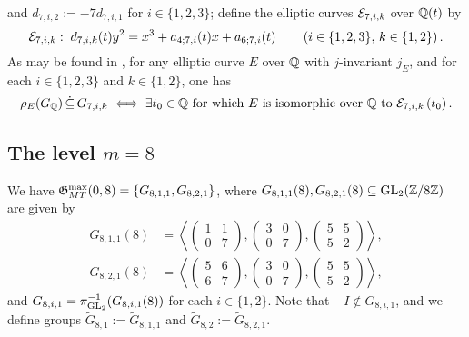 and $d_{7,i,2} := -7d_{7,i,1}$ for $i \in \{1, 2, 3 \}$; define the elliptic curves $\mathcal{E}_{7,i,k}$ over $\mathbb{Q}(t)$ by
\[
\mathcal{E}_{7,i,k} : \; d_{7,i,k}(t) y^2 = x^3 + a_{4;7,i}(t) x + a_{6;7,i}(t) \quad\quad \left( i \in \{ 1, 2, 3 \}, \, k \in \{1, 2 \} \right).
\]
As may be found in \cite{zywina}, for any elliptic curve $E$ over $\mathbb{Q}$ with $j$-invariant $j_E$, and for each $i \in \{ 1, 2, 3 \}$ and $k \in \{1, 2\}$, one has
\[
\rho_{E}(G_{\mathbb{Q}}) \, \dot\subseteq \, G_{7,i,k} \; \Longleftrightarrow \; \exists t_0 \in \mathbb{Q} \text{ for which } E \text{ is isomorphic over $\mathbb{Q}$ to } \mathcal{E}_{7,i,k}\left( t_0 \right). \\
\]

\medskip

\subsection{The level \texorpdfstring{$m=8$}.}

We have $\mathfrak{G}_{MT}^{\max}(0,8) = \{ G_{8,1,1}, G_{8,2,1} \}$, where $G_{8,1,1}(8), G_{8,2,1}(8) \subseteq \operatorname{GL}_2(\mathbb{Z}/8\mathbb{Z})$ are given by
\[
\begin{split}
G_{8,1,1}(8) &= \left\langle \begin{pmatrix} 1 & 1 \\ 0 & 7 \end{pmatrix}, \begin{pmatrix} 3 & 0 \\ 0 & 7 \end{pmatrix}, \begin{pmatrix} 5 & 5 \\ 5 & 2 \end{pmatrix} \right\rangle, \\
G_{8,2,1}(8) &= \left\langle \begin{pmatrix} 5 & 6 \\ 6 & 7 \end{pmatrix}, \begin{pmatrix} 3 & 0 \\ 0 & 7 \end{pmatrix}, \begin{pmatrix} 5 & 5 \\ 5 & 2 \end{pmatrix} \right\rangle,
\end{split}
\]
and $G_{8,i,1} = \pi_{\operatorname{GL}_2}^{-1}(G_{8,i,1}(8))$ for each $i \in \{1, 2 \}$. Note that $-I \notin G_{8,i,1}$, and we define groups $\tilde{G}_{8,1} := \tilde{G}_{8,1,1}$ and $\tilde{G}_{8,2} := \tilde{G}_{8,2,1}$.

